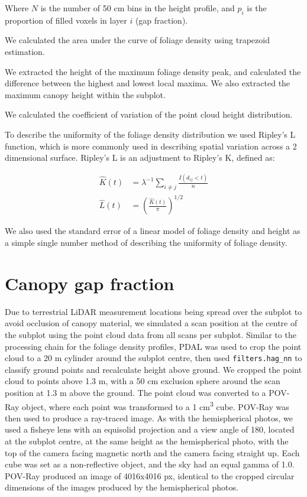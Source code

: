 \documentclass[11pt,a4paper]{article}
\begin{document}
Where $N$ is the number of 50 cm bins in the height profile, and $p_{i}$ is the proportion of filled voxels in layer $i$ (gap fraction).

We calculated the area under the curve of foliage density using trapezoid estimation.

We extracted the height of the maximum foliage density peak, and calculated the difference between the highest and lowest local maxima. We also extracted the maximum canopy height within the subplot.

We calculated the coefficient of variation of the point cloud height distribution.

To describe the uniformity of the foliage density distribution we used Ripley's L function, which is more commonly used in describing spatial variation across a 2 dimensional surface. Ripley's L is an adjustment to Ripley's K, defined as:

\begin{align}
	\widehat{K}(t) &= \lambda^{-1} \sum_{i\neq{}j} \frac{I(d_{ij} < t)}{n} \\
	\widehat{L}(t) &= \left(\frac{\widehat{K}(t)}{\pi}\right)^{1/2}
\end{align}

We also used the standard error of a linear model of foliage density and height as a simple single number method of describing the uniformity of foliage density.

\section{Canopy gap fraction}

Due to terrestrial LiDAR measurement locations being spread over the subplot to avoid occlusion of canopy material, we simulated a scan position at the centre of the subplot using the point cloud data from all scans per subplot. Similar to the processing chain for the foliage density profiles, PDAL was used to crop the point cloud to a 20 m cylinder around the subplot centre, then used \texttt{filters.hag\_nn} to classify ground points and recalculate height above ground. We cropped the point cloud to points above 1.3 m, with a 50 cm exclusion sphere around the scan position at 1.3 m above the ground. The point cloud was converted to a POV-Ray object, where each point was transformed to a 1 cm\textsuperscript{3} cube. POV-Ray was then used to produce a ray-traced image. As with the hemispherical photos, we used a fisheye lens with an equisolid projection and a view angle of 180\textdegree, located at the subplot centre, at the same height as the hemispherical photo, with the top of the camera facing magnetic north and the camera facing straight up. Each cube was set as a non-reflective object, and the sky had an equal gamma of 1.0. POV-Ray produced an image of 4016x4016 px, identical to the cropped circular dimensions of the images produced by the hemispherical photos.
\end{document}
